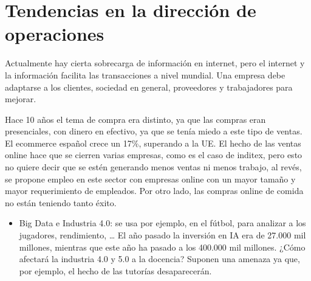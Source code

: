 \documentclass[12pt]{report} %
\providecommand{\tightlist}{%
  \setlength{\itemsep}{0pt}\setlength{\parskip}{0pt}}
\begin{document}
\hypertarget{tendencias-en-la-direcciuxf3n-de-operaciones}{%
\section{Tendencias en la dirección de
operaciones}\label{tendencias-en-la-direcciuxf3n-de-operaciones}}

Actualmente hay cierta sobrecarga de información en internet, pero el
internet y la información facilita las transacciones a nivel mundial.
Una empresa debe adaptarse a los clientes, sociedad en general,
proveedores y trabajadores para mejorar.

Hace 10 años el tema de compra era distinto, ya que las compras eran
presenciales, con dinero en efectivo, ya que se tenía miedo a este tipo
de ventas. El ecommerce español crece un 17\%, superando a la UE. El
hecho de las ventas online hace que se cierren varias empresas, como es
el caso de inditex, pero esto no quiere decir que se estén generando
menos ventas ni menos trabajo, al revés, se propone empleo en este
sector con empresas online con un mayor tamaño y mayor requerimiento de
empleados. Por otro lado, las compras online de comida no están teniendo
tanto éxito.

\begin{itemize}
\tightlist
\item
  Big Data e Industria 4.0: se usa por ejemplo, en el fútbol, para
  analizar a los jugadores, rendimiento, \ldots{} El año pasado la
  inversión en IA era de 27.000 mil millones, mientras que este año ha
  pasado a los 400.000 mil millones. ¿Cómo afectará la industria 4.0 y
  5.0 a la docencia? Suponen una amenaza ya que, por ejemplo, el hecho
  de las tutorías desaparecerán.
\end{itemize}


\end{document}
